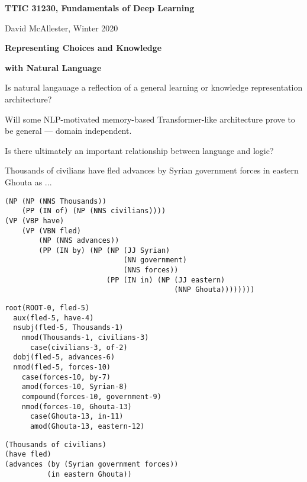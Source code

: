 




{\Huge

  \centerline{\bf TTIC 31230, Fundamentals of Deep Learning}
  \bigskip
  \centerline{David McAllester, Winter 2020}

\vfill
\centerline{\bf Representing Choices and Knowledge}
\vfill
\centerline{\bf with Natural Language}
  \vfill
  \vfill


Is natural langauage a reflection of a general learning or knowledge representation architecture?

\vfill
Will some NLP-motivated memory-based Transformer-like architecture prove to be general --- domain independent.

\vfill
Is there ultimately an important relationship between language and logic?


Thousands of civilians have fled advances by Syrian government forces in eastern Ghouta as ...

\begin{verbatim}
(NP (NP (NNS Thousands))
    (PP (IN of) (NP (NNS civilians))))
(VP (VBP have)
    (VP (VBN fled)
        (NP (NNS advances))
        (PP (IN by) (NP (NP (JJ Syrian)
                            (NN government)
                            (NNS forces))
                        (PP (IN in) (NP (JJ eastern)
                                        (NNP Ghouta))))))))
\end{verbatim}


\begin{verbatim}
root(ROOT-0, fled-5)
  aux(fled-5, have-4)
  nsubj(fled-5, Thousands-1)
    nmod(Thousands-1, civilians-3)
      case(civilians-3, of-2)
  dobj(fled-5, advances-6)
  nmod(fled-5, forces-10)
    case(forces-10, by-7)
    amod(forces-10, Syrian-8)
    compound(forces-10, government-9)
    nmod(forces-10, Ghouta-13)
      case(Ghouta-13, in-11)
      amod(Ghouta-13, eastern-12)
\end{verbatim}


\begin{verbatim}
(Thousands of civilians)
(have fled)
(advances (by (Syrian government forces))
          (in eastern Ghouta))
\end{verbatim}

}
